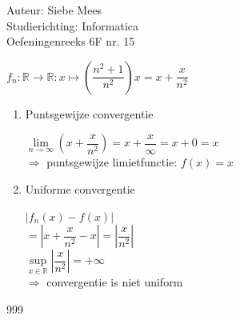 \documentclass[a4paper]{article}
\begin{document}
  
\noindent \large Auteur: Siebe Mees \\
\noindent \large Studierichting: Informatica\\
\noindent \large Oefeningenreeks 6F nr. 15\\

\medskip

\normalsize

$ f_n:\mathbb{R}\rightarrow \mathbb{R}:x\mapsto \left(\dfrac{n^2+1}{n^2}\right)x=x+\dfrac{x}{n^2} $\\

\begin{enumerate}

\item Puntsgewijze convergentie

$ \lim\limits_{n \rightarrow \infty}\left(x+\dfrac{x}{n^2}\right)=x+\dfrac{x}{\infty}=x+0=x $\\

$ \Rightarrow $ puntsgewijze limietfunctie: $ f(x)=x $\\

\item Uniforme convergentie

$ \left|f_n(x)-f(x)\right| $\\

$ =\left|x+\dfrac{x}{n^2}-x\right|=\left|\dfrac{x}{n^2}\right| $\\

$ \sup\limits_{x\in \mathbb{R}}\left|\dfrac{x}{n^2}\right|=+\infty $\\

$ \Rightarrow $ convergentie is niet uniform\\

\end{enumerate}

\begin{thebibliography}{999}
\end{thebibliography}
\end{document}
